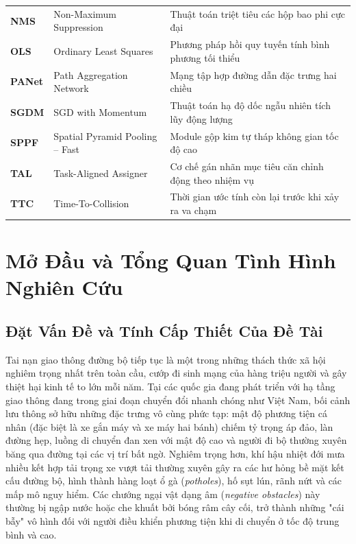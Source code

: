 \documentclass[12pt,a4paper]{article}
\begin{document}
\begin{table}[htbp]
\begin{tabularx}{\textwidth}{l p{5.5cm} X}
\textbf{NMS} & Non-Maximum Suppression & Thuật toán triệt tiêu các hộp bao phi cực đại \\
\textbf{OLS} & Ordinary Least Squares & Phương pháp hồi quy tuyến tính bình phương tối thiểu \\
\textbf{PANet} & Path Aggregation Network & Mạng tập hợp đường dẫn đặc trưng hai chiều \\
\textbf{SGDM} & SGD with Momentum & Thuật toán hạ độ dốc ngẫu nhiên tích lũy động lượng \\
\textbf{SPPF} & Spatial Pyramid Pooling -- Fast & Module gộp kim tự tháp không gian tốc độ cao \\
\textbf{TAL} & Task-Aligned Assigner & Cơ chế gán nhãn mục tiêu căn chỉnh động theo nhiệm vụ \\
\textbf{TTC} & Time-To-Collision & Thời gian ước tính còn lại trước khi xảy ra va chạm \\
\bottomrule
\end{tabularx}
\end{table}

\newpage
\section{Mở Đầu và Tổng Quan Tình Hình Nghiên Cứu}
\label{sec:mo_dau_va_tong_quan}

\subsection{Đặt Vấn Đề và Tính Cấp Thiết Của Đề Tài}
Tai nạn giao thông đường bộ tiếp tục là một trong những thách thức xã hội nghiêm trọng nhất trên toàn cầu, cướp đi sinh mạng của hàng triệu người và gây thiệt hại kinh tế to lớn mỗi năm. Tại các quốc gia đang phát triển với hạ tầng giao thông đang trong giai đoạn chuyển đổi nhanh chóng như Việt Nam, bối cảnh lưu thông sở hữu những đặc trưng vô cùng phức tạp: mật độ phương tiện cá nhân (đặc biệt là xe gắn máy và xe máy hai bánh) chiếm tỷ trọng áp đảo, làn đường hẹp, luồng di chuyển đan xen với mật độ cao và người đi bộ thường xuyên băng qua đường tại các vị trí bất ngờ. Nghiêm trọng hơn, khí hậu nhiệt đới mưa nhiều kết hợp tải trọng xe vượt tải thường xuyên gây ra các hư hỏng bề mặt kết cấu đường bộ, hình thành hàng loạt ổ gà (\textit{potholes}), hố sụt lún, rãnh nứt và các mấp mô nguy hiểm. Các chướng ngại vật dạng âm (\textit{negative obstacles}) này thường bị ngập nước hoặc che khuất bởi bóng râm cây cối, trở thành những "cái bẫy" vô hình đối với người điều khiển phương tiện khi di chuyển ở tốc độ trung bình và cao.
\end{document}
